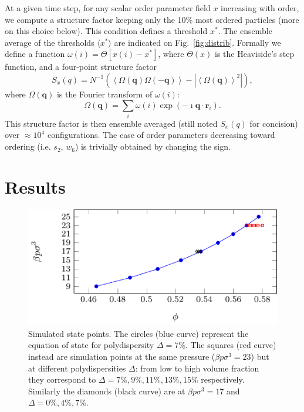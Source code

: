 \documentclass[twocolumn,superscriptaddress]{revtex4}
\begin{document}
At a given time step, for any scalar order parameter field $x$ increasing with order, we compute a structure factor keeping only the 10\% most ordered particles (more on this choice below). This condition defines a threshold $x^*$. The ensemble average of the thresholds $\langle x^*\rangle$ are indicated on Fig.~\ref{fig:distrib}. Formally we define a function $\omega(i) = \Theta [x(i) - x^*]$, where $\Theta(x)$ is the Heaviside’s step function, and a four-point structure factor
\begin{equation}
	S_x(q) = N^{-1}(\left\langle \Omega(\mathbf{q}) \Omega(-\mathbf{q}) \right\rangle - | \left\langle \Omega(\mathbf{q}) \right\rangle^2 |),   
	\label{eq:StrutureFactor}
\end{equation}
where $\Omega(\mathbf{q})$ is the Fourier transform of $\omega(i)$: 
\begin{equation}
	\Omega(\mathbf{q}) = \sum_i \omega(i)\exp(-\imath \mathbf{q}\cdot\mathbf{r}_i).  
\end{equation}
This structure factor is then ensemble averaged (still noted $S_x(q)$ for concision) over $\approx 10^4$ configurations. The case of order parameters decreasing toward ordering (i.e. $s_2$, $w_6$) is trivially obtained by changing the sign.



\section{Results}\label{sec:results}

\begin{figure}
 \centering
 \includegraphics{fig_eos}
 \caption{Simulated state points. The circles (blue curve) represent the equation of state for polydispersity $\Delta=7\%$. The squares (red curve) instead are simulation points at the same pressure ($\beta p\sigma^3=23$) but at different polydispersities $\Delta$: from low to high volume fraction they correspond to $\Delta=7\%,9\%,11\%,13\%,15\%$ respectively. Similarly the diamonds (black curve) are at $\beta p\sigma^3=17$ and $\Delta=0\%,4\%,7\%$.}
 \label{fig:eos}
\end{figure}
\end{document}
